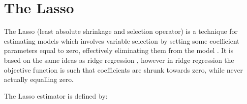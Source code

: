 










\section{The Lasso}

The Lasso (least absolute shrinkage and selection operator) is a technique for estimating models which involves variable selection by setting some coefficient parameters equal to zero, effectively eliminating them from the model \cite{tibshirani}. It is based on the same ideas as ridge regression \cite{ridgeregression70}, however in ridge regression the objective function is such that coefficients are shrunk towards zero, while never actually equalling zero. 

The Lasso estimator is defined by:

\newcommand*{\argmin}{\operatornamewithlimits{argmin}\limits}
 
